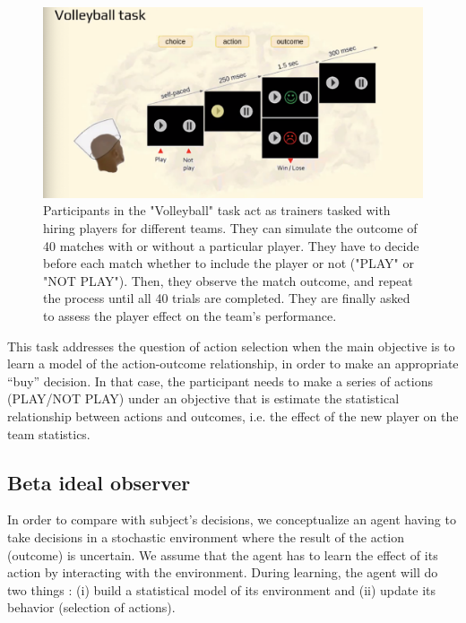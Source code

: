 \documentclass[10pt,letterpaper]{article}
\begin{document}
\begin{figure}[h]
\centering
\includegraphics[width=\textwidth]{figs/vb_task.png}
\caption{Participants in the "Volleyball" task act as trainers tasked with hiring players for different teams. They can simulate the outcome of 40 matches with or without a particular player. They have to decide before each match whether to include the player or not ("PLAY" or "NOT PLAY"). Then, they observe the match outcome, and repeat the process until all 40 trials are completed. They are finally asked to assess the player effect on the team's performance.}
\label{fig:1}
\end{figure}

This task addresses the question of action selection when the main objective is to learn a model of the action-outcome relationship, in order to make an appropriate ``buy'' decision. In that case, the participant needs to make a series of actions (PLAY/NOT PLAY) under an objective that is estimate the statistical relationship between actions and outcomes, i.e. the effect of the new player on the team statistics.




\subsection{Beta ideal observer}

In order to compare with subject's decisions, we conceptualize an agent having to take decisions in a stochastic environment where the result of the action (outcome) is uncertain.
We assume that the agent has to learn the effect of its action by interacting with the environment. During learning, the agent will do two things : (i) build a statistical model of its environment and (ii) update its behavior (selection of actions). 
\end{document}
